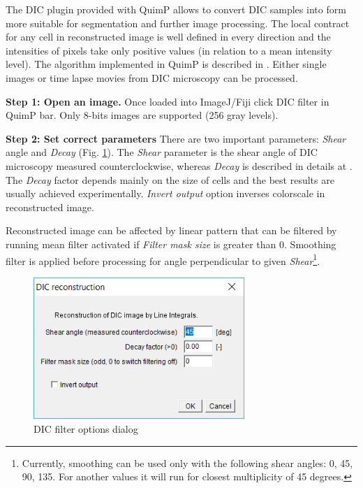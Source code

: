\documentclass[a4paper,12pt]{article}
\begin{document}
The DIC plugin provided with QuimP allows to convert DIC samples into form more suitable for segmentation and further image processing. The local contract for any cell in reconstructed image is well defined in every direction and the intensities of pixels take only positive values (in relation to a mean intensity level). The algorithm implemented in QuimP is described in \cite{Kam1998}. Either single images or time lapse movies from DIC microscopy can be processed. 

\textbf{Step 1: Open an image.}
Once loaded into ImageJ/Fiji click DIC filter in QuimP bar. Only 8-bits images are supported (256 gray levels).

\textbf{Step 2: Set correct parameters}
There are two important parameters: \textit{Shear} angle and \textit{Decay} (Fig. \ref{fig:dicdialog}). The \textit{Shear} parameter is the shear angle of DIC microscopy measured counterclockwise, whereas \textit{Decay} is described in details at \cite{Kam1998}. The \textit{Decay} factor depends mainly on the size of cells and the best results are usually achieved experimentally. \textit{Invert output} option inverses colorscale in reconstructed image.

Reconstructed image can be affected by linear pattern that can be filtered by running mean filter activated if \textit{Filter mask size} is greater than 0. Smoothing filter is applied before processing for angle perpendicular to given \textit{Shear}\footnote{Currently, smoothing can be used only with the following shear angles: 0, 45, 90, 135. For another values it will run for closest multiplicity of 45 degrees.}.
   
\begin{figure}[ht]
	\centering
	\includegraphics[width=8cm]{DICwindow.png} 
	\caption{DIC filter options dialog}
	\label{fig:dicdialog}
\end{figure} 

\noindent{}
\end{document}
